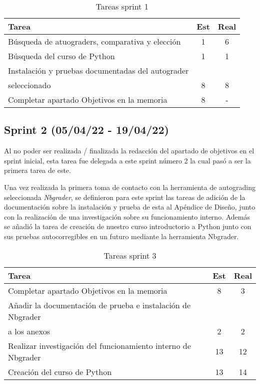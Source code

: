 \begin{table}[h]
\begin{center}
\begin{tabular}{| l | c | c |}
\textbf{Tarea}                   & \textbf{Est} & \textbf{Real} \\ \hline
Búsqueda de atuograders, comparativa y elección & 1 & 6 \\
Búsqueda del curso de Python & 1 & 1 \\
Instalación y pruebas documentadas del autograder &  & \\
seleccionado & 8 & 8 \\
Completar apartado Objetivos en la memoria & 8 & - \\ \hline
\end{tabular}
\caption{Tareas sprint 1}
\label{tab:sprint}
\end{center}
\end{table}

\subsection{Sprint 2 (05/04/22 - 19/04/22)}
Al no poder ser realizada / finalizada la redacción del apartado de objetivos en el sprint inicial, esta tarea fue delegada a este sprint número 2 la cual pasó a ser la primera tarea de este. 

Una vez realizada la primera toma de contacto con la herramienta de autograding seleccionada \textit{Nbgrader}\cite{tool:Nbgrader}, se definieron para este sprint las tareas de adición de la documentación sobre la instalación y prueba de esta al Apéndice de Diseño, junto con la realización de una investigación sobre su funcionamiento interno. Además se añadió la tarea de creación de nuestro curso introductorio a Python junto con sus pruebas autocorregibles en un futuro mediante la herramienta Nbgrader. 

\begin{table}[h]
\begin{center}
\begin{tabular}{| l | c | c |}
\textbf{Tarea}                   & \textbf{Est} & \textbf{Real} \\ \hline
Completar apartado Objetivos en la memoria & 8 & 3 \\
Añadir la documentación de prueba e instalación de Nbgrader & &\\
a los anexos & 2 & 2 \\
Realizar investigación del funcionamiento interno de Nbgrader & 13 & 12 \\
Creación del curso de Python & 13 & 14 \\ \hline
\end{tabular}
\caption{Tareas sprint 3}
\label{tab:sprint}
\end{center}
\end{table}

